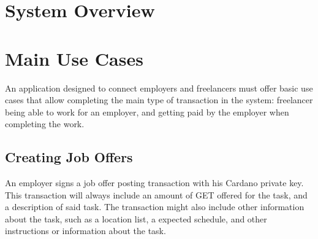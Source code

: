 \documentclass{article}
\begin{document}
\section{System Overview}

\newpage


\section{Main Use Cases}
An application designed to connect employers and freelancers must offer basic use cases that allow completing the main type of transaction in the system: freelancer being able to work for an employer, and getting paid by the employer when completing the work.

\subsection{Creating Job Offers}
An employer signs a job offer posting transaction with his Cardano private key. This transaction will always include an amount of GET offered for the task, and a description of said task. The transaction might also include other information about the task, such as a location list, a expected schedule, and other instructions or information about the task.
\end{document}
